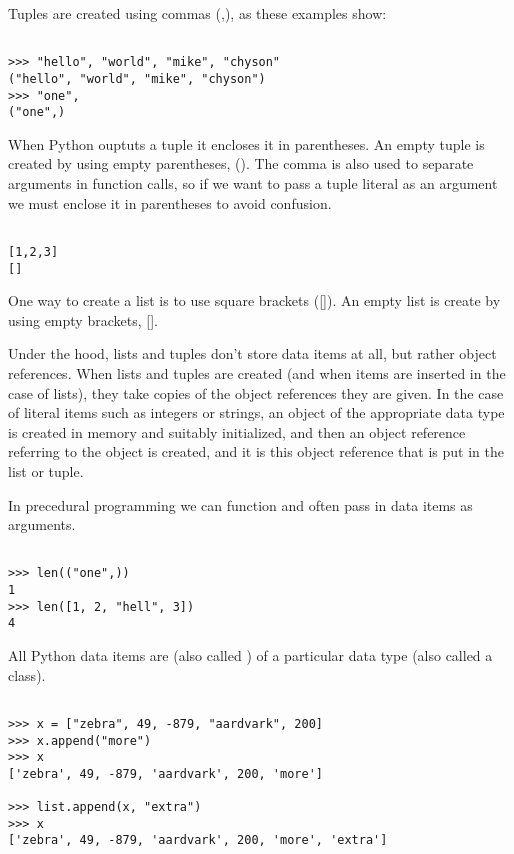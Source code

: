 Tuples are created using commas (,), as these examples show:
\begin{lstlisting}

>>> "hello", "world", "mike", "chyson"
("hello", "world", "mike", "chyson")
>>> "one",
("one",)
\end{lstlisting}


When Python ouptuts a tuple it encloses it in parentheses.
An empty tuple is created by using empty parentheses, ().
The comma is also used to separate arguments in function calls, so if we want to pass a tuple literal as an argument we must enclose it in parentheses to avoid confusion.


\begin{lstlisting}

[1,2,3]
[]
\end{lstlisting}

One way to create a list is to use square brackets ([]).
An empty list is create by using empty brackets, [].


Under the hood, lists and tuples don't store data items at all, but rather object references.
When lists and tuples are created (and when items are inserted in the case of lists), they take copies of the object references they are given.
In the case of literal items such as integers or strings, an object of the appropriate data type is created in memory and suitably initialized, and then an object reference referring to the object is created, and it is this object reference that is put in the list or tuple.



In precedural programming we can function and often pass in data items as arguments.
\begin{lstlisting}

>>> len(("one",))
1
>>> len([1, 2, "hell", 3])
4
\end{lstlisting}



All Python data items are  (also called ) of a particular data type (also called a class).



\begin{lstlisting}

>>> x = ["zebra", 49, -879, "aardvark", 200] 
>>> x.append("more")
>>> x
['zebra', 49, -879, 'aardvark', 200, 'more']

>>> list.append(x, "extra")
>>> x
['zebra', 49, -879, 'aardvark', 200, 'more', 'extra']
\end{lstlisting}


